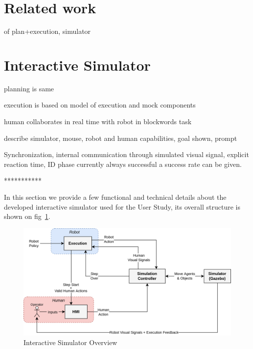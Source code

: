 \section{Related work}
of plan+execution, simulator

\section{Interactive Simulator}
planning is same

execution is based on model of execution and mock components

human collaborates in real time with robot in blockwords task

describe simulator, mouse, robot and human capabilities, goal shown, prompt

Synchronization, internal communication through simulated visual signal, explicit reaction time, ID phase currently always successful a success rate can be given. 


***********

In this section we provide a few functional and technical details about the developed interactive simulator used for the User Study, its overall structure is shown on fig~\ref{fig:iteractive_simulator}.

\begin{figure}
    \includegraphics[width=\textwidth]{images/Chapter5/simulator.png}
    \caption{Interactive Simulator Overview}
    \label{fig:iteractive_simulator}
\end{figure}

